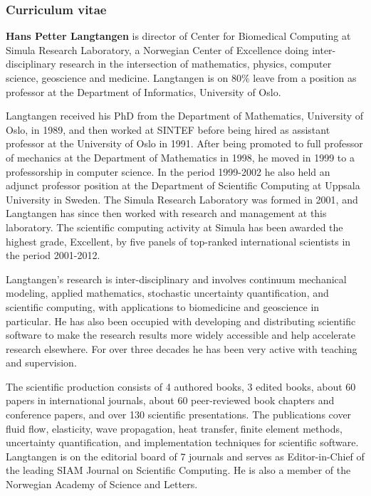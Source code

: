 \subsubsection*{Curriculum vitae}


{\bf Hans Petter Langtangen} is director of Center for Biomedical Computing at Simula Research Laboratory, a Norwegian Center of Excellence doing inter-disciplinary research in the intersection of mathematics, physics, computer science, geoscience and medicine. Langtangen is on 80\% leave from a position as professor at the Department of Informatics, University of Oslo.

Langtangen received his PhD from the Department of Mathematics, University of Oslo, in 1989, and then worked at SINTEF before being hired as assistant professor at the University of Oslo in 1991. After being promoted to full professor of mechanics at the Department of Mathematics in 1998, he moved in 1999 to a professorship in computer science. In the period 1999-2002 he also held an adjunct professor position at the Department of Scientific Computing at Uppsala University in Sweden. The Simula Research Laboratory was formed in 2001, and Langtangen has since then worked with research and management at this laboratory. The scientific computing activity at Simula has been awarded the highest grade, Excellent, by five panels of top-ranked international scientists in the period 2001-2012.

Langtangen's research is inter-disciplinary and involves continuum mechanical modeling, applied mathematics, stochastic uncertainty quantification, and scientific computing, with applications to biomedicine and geoscience in particular. He has also been occupied with developing and distributing scientific software to make the research results more widely accessible and help accelerate research elsewhere. For over three decades he has been very active with teaching and supervision.

The scientific production consists of 4 authored books, 3 edited books, about 60 papers in international journals, about 60 peer-reviewed book chapters and conference papers, and over 130 scientific presentations. The publications cover fluid flow, elasticity, wave propagation, heat transfer, finite element methods, uncertainty quantification, and implementation techniques for scientific software. Langtangen is on the editorial board of 7 journals and serves as Editor-in-Chief of the leading SIAM Journal on Scientific Computing. He is also a member of the Norwegian Academy of Science and Letters.
%
%
%

